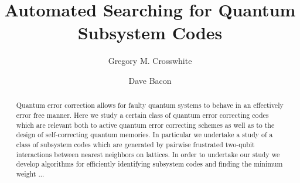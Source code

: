 \documentclass[twocolumn,showpacs,preprintnumbers,amsmath,amssymb,nofootinbib,pra,floatfix]{revtex4-1}
\begin{document}
\title{Automated Searching for Quantum Subsystem Codes}

\author{Gregory M. Crosswhite}
\author{Dave Bacon}



\begin{abstract}
Quantum error correction allows for faulty quantum systems to behave in an effectively error free manner.  Here we study a certain class of quantum error correcting codes which are relevant both to active quantum error correcting schemes as well as to the design of self-correcting quantum memories.  In particular we undertake a study of a class of subsystem codes which are generated by pairwise frustrated two-qubit interactions between nearest neighbors on lattices.  In order to undertake our study we develop algorithms for efficiently identifying subsystem codes and finding the minimum weight ...
\end{abstract}

\maketitle

\newpage

\end{document}
